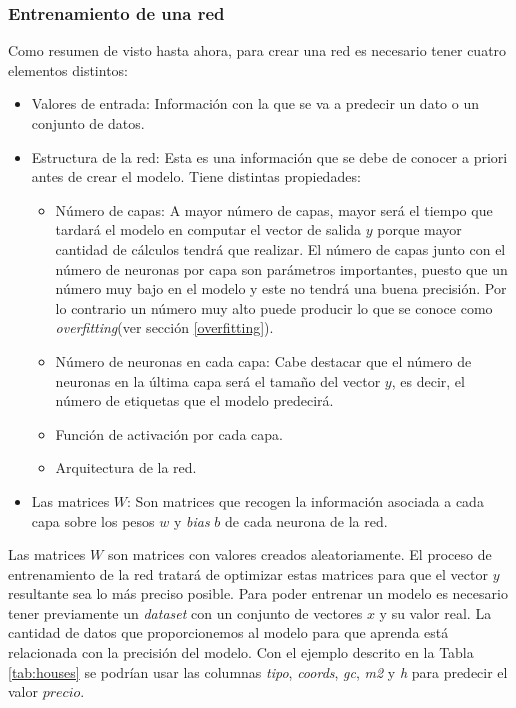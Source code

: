 \subsubsection{Entrenamiento de una red}\label{training}
Como resumen de visto hasta ahora, para crear una red es necesario tener cuatro elementos distintos:
\begin{itemize}
\item Valores de entrada: Información con la que se va a predecir un dato o un conjunto de datos.
\item Estructura de la red: Esta es una información que se debe de conocer a priori antes de crear el modelo. Tiene distintas propiedades:
\begin{itemize}
    \item Número de capas: A mayor número de capas, mayor será el tiempo que tardará el modelo en computar el vector de salida $y$ porque mayor cantidad de cálculos tendrá que realizar. El número de capas junto con el número de neuronas por capa son parámetros importantes, puesto que un número muy bajo en el modelo y este no tendrá una buena precisión. Por lo contrario un número muy alto puede producir lo que se conoce como \textit{overfitting}(ver sección \ref{overfitting}).
    \item Número de neuronas en cada capa: Cabe destacar que el número de neuronas en la última capa será el tamaño del vector $y$, es decir, el número de etiquetas que el modelo predecirá.
    \item Función de activación por cada capa.
    \item Arquitectura de la red. %
\end{itemize}
\item Las matrices $W$: Son matrices que recogen la información asociada a cada capa sobre los pesos $w$ y \textit{bias} $b$ de cada neurona de la red.
\end{itemize}

Las matrices $W$ son matrices con valores creados aleatoriamente. El proceso de entrenamiento de la red tratará de optimizar estas matrices para que el vector $y$ resultante sea lo más preciso posible. Para poder entrenar un modelo es necesario tener previamente un \textit{dataset} con un conjunto de vectores $x$ y su valor real. La cantidad de datos que proporcionemos al modelo para que aprenda está relacionada con la precisión del modelo. Con el ejemplo descrito en la Tabla \ref{tab:houses} se podrían usar las columnas \textit{tipo}, \textit{coords}, \textit{gc}, \textit{m2} y \textit{h} para predecir el valor $precio$.
\newline

